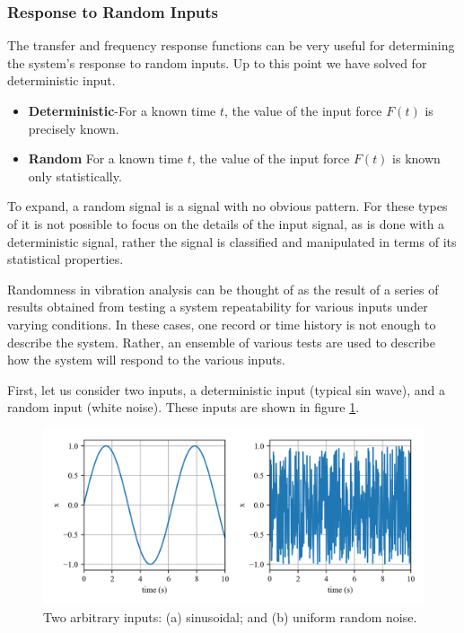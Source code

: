 \documentclass[12pt,letter]{article}
\begin{document}
\subsubsection{Response to Random Inputs}
The transfer and frequency response functions can be very useful for determining the system's response to random inputs. Up to this point we have solved for deterministic input. 

\begin{itemize}
\item \textbf{Deterministic}-For a known time $t$, the value of the input force $F(t)$ is precisely known. 
\item \textbf{Random} For a known time $t$, the value of the input force $F(t)$ is known only statistically. 
\end{itemize}

To expand, a random signal is a signal with no obvious pattern. For these types of it is not possible to focus on the details of the input signal, as is done with a deterministic signal, rather the signal is classified and manipulated in terms of its statistical properties. 

Randomness in vibration analysis can be thought of as the result of a series of results obtained from testing a system repeatability for various inputs under varying conditions. In these cases, one record or time history is not enough to describe the system. Rather, an ensemble of various tests are used to describe how the system will respond to the various inputs. 

First, let us consider two inputs, a deterministic input (typical sin wave), and a random input (white noise). These inputs are shown in figure \ref{fig:Response_to_random_input_inputs}. 

\begin{figure}[H]
	\centering
	\includegraphics[width=1\textwidth]{../figures/Response_to_random_input_inputs.png}
	\caption{Two arbitrary inputs: (a) sinusoidal; and (b) uniform random noise.}
	\label{fig:Response_to_random_input_inputs}
\end{figure}
\end{document}
